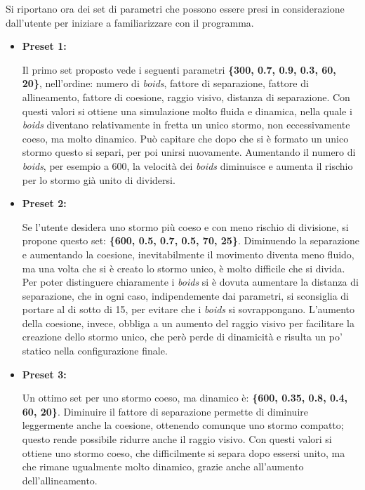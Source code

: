 \documentclass{article}
\begin{document}
Si riportano ora dei set di parametri che possono essere presi in considerazione
 dall'utente per iniziare a familiarizzare con il programma. 

\begin{itemize}
     

\item \large\textbf{Preset 1:} \normalsize 

 Il primo set proposto vede i seguenti parametri \textbf{\{300, 0.7, 0.9, 0.3, 
 60, 20\}}, nell'ordine: numero di \textit{boids}, fattore di separazione, 
 fattore di allineamento, fattore di coesione, raggio visivo, distanza di 
 separazione. Con questi valori si ottiene una simulazione molto fluida e 
 dinamica, nella quale i \textit{boids} diventano relativamente in fretta un 
 unico stormo, non eccessivamente coeso, ma molto dinamico. Può capitare che 
 dopo che si è formato un unico stormo questo si separi, per poi unirsi 
 nuovamente. Aumentando il numero di \textit{boids}, per esempio a 600, la 
 velocità dei \textit{boids} diminuisce e aumenta il rischio per lo stormo già 
 unito di dividersi.

\item \large\textbf{Preset 2:} \normalsize

Se l'utente desidera uno stormo più coeso e con meno rischio di divisione, si 
propone questo set: \textbf{\{600, 0.5, 0.7, 0.5, 70, 25\}}. Diminuendo la 
separazione e aumentando la coesione, inevitabilmente il movimento diventa meno 
fluido, ma una volta che si è creato lo stormo unico, è molto difficile che si 
divida. Per poter distinguere chiaramente i \textit{boids} si è dovuta aumentare
 la distanza di separazione, che in ogni caso, indipendemente dai parametri, si 
 sconsiglia di portare al di sotto di 15, per evitare che i \textit{boids} si 
 sovrappongano. L'aumento della coesione, invece, obbliga a un aumento del 
 raggio visivo per facilitare la creazione dello stormo unico, che però perde di
  dinamicità e risulta un po' statico nella configurazione finale. 

\item \large\textbf{Preset 3:} \normalsize 

Un ottimo set per uno stormo coeso, ma dinamico è: \textbf{\{600, 0.35, 0.8, 
0.4, 60, 20\}}. Diminuire il fattore di separazione permette di diminuire 
leggermente anche la coesione, ottenendo comunque uno stormo compatto; questo 
rende possibile ridurre anche il raggio visivo. Con questi valori si ottiene uno
 stormo coeso, che difficilmente si separa dopo essersi unito, ma che rimane 
 ugualmente molto dinamico, grazie anche all'aumento dell'allineamento.


\end{itemize}
\end{document}
